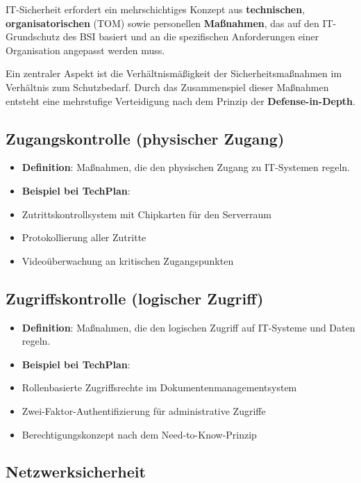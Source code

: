 \documentclass{orgstandard}
\begin{document}
IT-Sicherheit erfordert ein mehrschichtiges Konzept aus \textbf{technischen}, \textbf{organisatorischen} (TOM) sowie personellen \textbf{Maßnahmen}, das auf den IT-Grundschutz des BSI basiert und an die spezifischen Anforderungen einer Organisation angepasst werden muss.
\begin{NOTES}
Ein zentraler Aspekt ist die Verhältnismäßigkeit der Sicherheitsmaßnahmen im Verhältnis zum Schutzbedarf. Durch das Zusammenspiel dieser Maßnahmen entsteht eine mehrstufige Verteidigung nach dem Prinzip der \textbf{Defense-in-Depth}.
\end{NOTES}

\subsection{Zugangskontrolle (physischer Zugang)}
\label{sec:orgdc06d73}
\begin{itemize}
\item \textbf{Definition}: Maßnahmen, die den physischen Zugang zu IT-Systemen regeln.
\item \textbf{Beispiel bei TechPlan}:
\item Zutrittskontrollsystem mit Chipkarten für den Serverraum
\item Protokollierung aller Zutritte
\item Videoüberwachung an kritischen Zugangspunkten
\end{itemize}

\subsection{Zugriffskontrolle (logischer Zugriff)}
\label{sec:orgfeb22fd}
\begin{itemize}
\item \textbf{Definition}: Maßnahmen, die den logischen Zugriff auf IT-Systeme und Daten regeln.
\item \textbf{Beispiel bei TechPlan}:
\item Rollenbasierte Zugriffsrechte im Dokumentenmanagementsystem
\item Zwei-Faktor-Authentifizierung für administrative Zugriffe
\item Berechtigungskonzept nach dem Need-to-Know-Prinzip
\end{itemize}

\subsection{Netzwerksicherheit}
\label{sec:org1083a4f}
\end{document}
